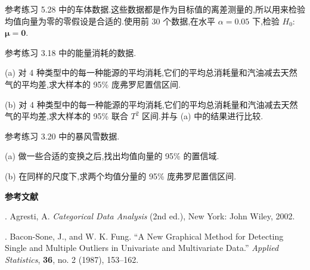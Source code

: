 \quad 参考练习 5.28 中的车体数据.这些数据都是作为目标值的离差测量的,所以用来检验均值向量为零的零假设是合适的.使用前 30 个数据,在水平 $\alpha=0.05$ 下,检验 $H_0$: $\boldsymbol{\mu}=\mathbf{0}$.

\quad 参考练习 3.18 中的能量消耗的数据.

(a) 对 4 种类型中的每一种能源的平均消耗,它们的平均总消耗量和汽油减去天然气的平均差,求大样本的 95\% 庞弗罗尼置信区间.

(b) 对 4 种类型中的每一种能源的平均消耗,它们的平均总消耗量和汽油减去天然气的平均差,求大样本的 95\% 联合 $T^2$ 区间.并与 (a) 中的结果进行比较.

\quad 参考练习 3.20 中的暴风雪数据.

(a) 做一些合适的变换之后,找出均值向量的 95\% 的置信域.

(b) 在同样的尺度下,求两个均值分量的 95\% 庞弗罗尼置信区间.

\begin{center}
\label{bib:5}
\textbf{参考文献}
\end{center}

. Agresti, A. \textit{Categorical Data Analysis} (2nd ed.), New York: John Wiley, 2002.

. Bacon-Sone, J., and W. K. Fung. ``A New Graphical Method for Detecting Single and Multiple Outliers in Univariate and Multivariate Data.'' \textit{Applied Statistics}, \textbf{36}, no. 2 (1987), 153--162.
